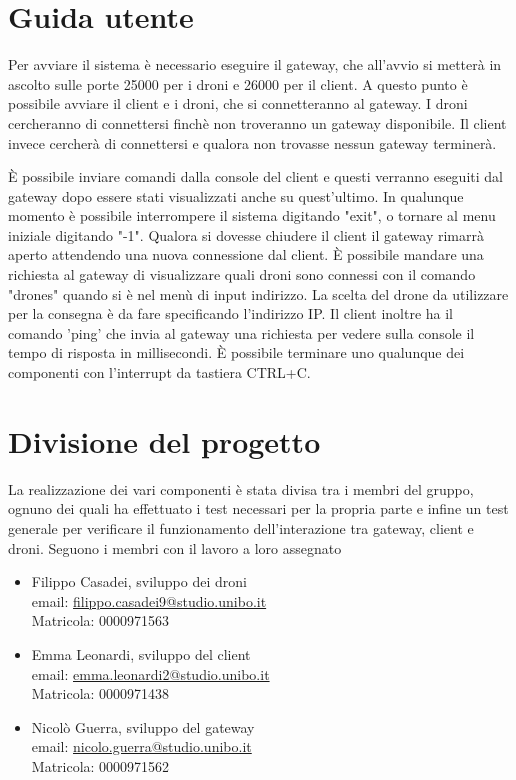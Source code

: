 \documentclass[a4paper,12pt]{report}
\begin{document}
\appendix
\chapter{Guida utente}

Per avviare il sistema è necessario eseguire il gateway, che all'avvio si metterà in ascolto sulle porte 25000 per i droni e 26000 per il client.
A questo punto è possibile avviare il client e i droni, che si connetteranno al gateway. I droni cercheranno di connettersi finchè non troveranno un gateway
disponibile. Il client invece cercherà di connettersi e qualora non trovasse nessun gateway terminerà.

È possibile inviare comandi dalla console del client e questi verranno eseguiti dal gateway dopo essere stati visualizzati anche su quest'ultimo. In qualunque momento è possibile
interrompere il sistema digitando "exit", o tornare al menu iniziale digitando "-1".
Qualora si dovesse chiudere il client il gateway rimarrà aperto attendendo una nuova connessione dal client.
È possibile mandare una richiesta al gateway di visualizzare quali droni sono connessi con il comando "drones" quando si è nel menù di input indirizzo. La scelta del drone da 
utilizzare per la consegna è da fare specificando l'indirizzo IP. Il client inoltre ha il comando 'ping' che invia al gateway una richiesta per vedere sulla console il tempo di risposta in millisecondi.
È possibile terminare uno qualunque dei componenti con l'interrupt da tastiera CTRL+C.

\chapter{Divisione del progetto}
La realizzazione dei vari componenti è stata divisa tra i membri del gruppo, ognuno dei quali ha effettuato i test necessari per la propria parte e infine un test generale per
verificare il funzionamento dell'interazione tra gateway, client e droni.
Seguono i membri con il lavoro a loro assegnato
\begin{itemize}
    \item Filippo Casadei, sviluppo dei droni\\ email: \url{filippo.casadei9@studio.unibo.it}\\ Matricola: 0000971563
    \item Emma Leonardi, sviluppo del client\\ email: \url{emma.leonardi2@studio.unibo.it}\\ Matricola: 0000971438
    \item Nicolò Guerra, sviluppo del gateway\\ email: \url{nicolo.guerra@studio.unibo.it} \\ Matricola: 0000971562
\end{itemize}
\end{document}
